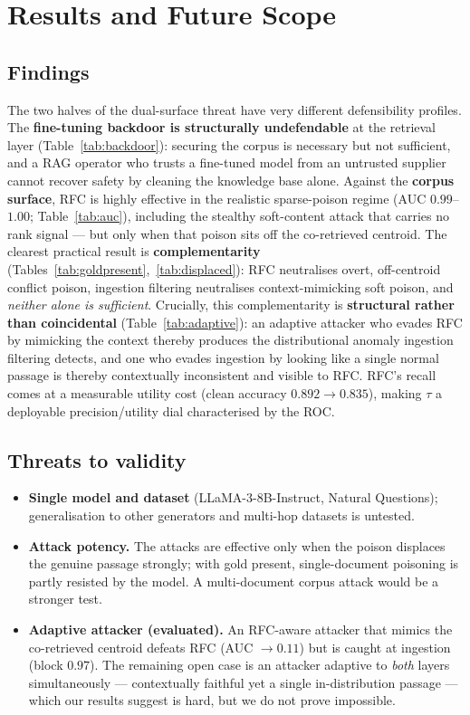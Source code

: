 \documentclass[9pt,a4paper,twoside]{rho-class/rho}
\begin{document}
\section{Results and Future Scope}

\subsection{Findings}

The two halves of the dual-surface threat have very different defensibility profiles. The \textbf{fine-tuning backdoor is structurally undefendable} at the retrieval layer (Table~\ref{tab:backdoor}): securing the corpus is necessary but not sufficient, and a RAG operator who trusts a fine-tuned model from an untrusted supplier cannot recover safety by cleaning the knowledge base alone. Against the \textbf{corpus surface}, RFC is highly effective in the realistic sparse-poison regime (AUC $0.99$--$1.00$; Table~\ref{tab:auc}), including the stealthy soft-content attack that carries no rank signal --- but only when that poison sits off the co-retrieved centroid. The clearest practical result is \textbf{complementarity} (Tables~\ref{tab:goldpresent},~\ref{tab:displaced}): RFC neutralises overt, off-centroid conflict poison, ingestion filtering neutralises context-mimicking soft poison, and \emph{neither alone is sufficient}. Crucially, this complementarity is \textbf{structural rather than coincidental} (Table~\ref{tab:adaptive}): an adaptive attacker who evades RFC by mimicking the context thereby produces the distributional anomaly ingestion filtering detects, and one who evades ingestion by looking like a single normal passage is thereby contextually inconsistent and visible to RFC. RFC's recall comes at a measurable utility cost (clean accuracy $0.892\!\to\!0.835$), making $\tau$ a deployable precision/utility dial characterised by the ROC.

\subsection{Threats to validity}
\begin{itemize}
    \item \textbf{Single model and dataset} (LLaMA-3-8B-Instruct, Natural Questions); generalisation to other generators and multi-hop datasets is untested.
    \item \textbf{Attack potency.} The attacks are effective only when the poison displaces the genuine passage strongly; with gold present, single-document poisoning is partly resisted by the model. A multi-document corpus attack would be a stronger test.
    \item \textbf{Adaptive attacker (evaluated).} An RFC-aware attacker that mimics the co-retrieved centroid defeats RFC (AUC $\to 0.11$) but is caught at ingestion (block $0.97$). The remaining open case is an attacker adaptive to \emph{both} layers simultaneously --- contextually faithful yet a single in-distribution passage --- which our results suggest is hard, but we do not prove impossible.
\end{itemize}
\end{document}
